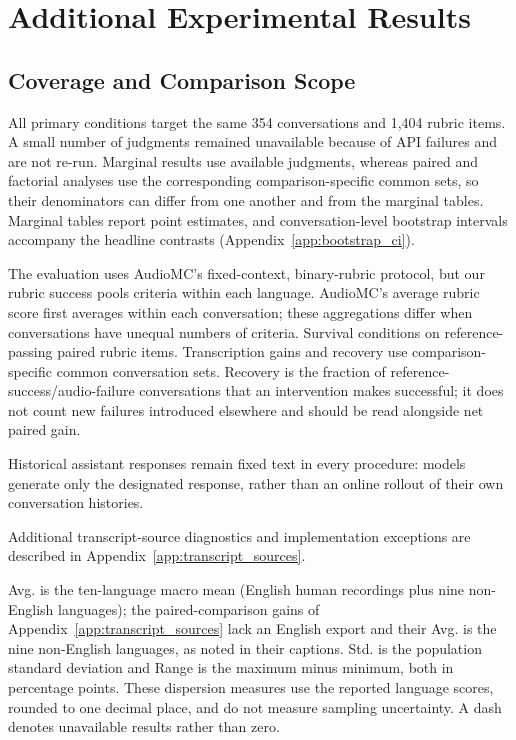 \section{Additional Experimental Results}

\label{app:experimental_results}

\subsection{Coverage and Comparison Scope}

\label{app:result_coverage}

All primary conditions target the same 354 conversations and 1,404 rubric items. A small number of judgments remained unavailable because of API failures and are not re-run. Marginal results use available judgments, whereas paired and factorial analyses use the corresponding comparison-specific common sets, so their denominators can differ from one another and from the marginal tables. Marginal tables report point estimates, and conversation-level bootstrap intervals accompany the headline contrasts (Appendix~\ref{app:bootstrap_ci}).

The evaluation uses AudioMC's fixed-context, binary-rubric protocol, but our rubric success pools criteria within each language. AudioMC's average rubric score first averages within each conversation; these aggregations differ when conversations have unequal numbers of criteria. Survival conditions on reference-passing paired rubric items. Transcription gains and recovery use comparison-specific common conversation sets. Recovery is the fraction of reference-success/audio-failure conversations that an intervention makes successful; it does not count new failures introduced elsewhere and should be read alongside net paired gain.

Historical assistant responses remain fixed text in every procedure: models generate only the designated response, rather than an online rollout of their own conversation histories.

Additional transcript-source diagnostics and implementation exceptions are described in Appendix~\ref{app:transcript_sources}.

Avg. is the ten-language macro mean (English human recordings plus nine non-English languages); the paired-comparison gains of Appendix~\ref{app:transcript_sources} lack an English export and their Avg. is the nine non-English languages, as noted in their captions. Std. is the population standard deviation and Range is the maximum minus minimum, both in percentage points. These dispersion measures use the reported language scores, rounded to one decimal place, and do not measure sampling uncertainty. A dash denotes unavailable results rather than zero.

